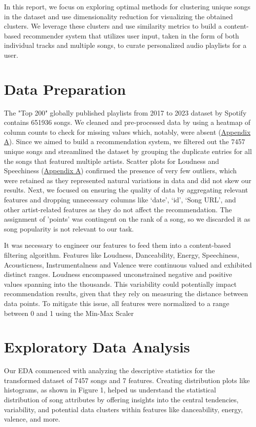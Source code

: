 \documentclass{article}
\begin{document}
In this report, we focus on exploring optimal methods for clustering unique songs in the dataset and use dimensionality reduction for visualizing the obtained clusters. We leverage these clusters and use similarity metrics to build a content-based recommender system that utilizes user input, taken in the form of both individual tracks and multiple songs, to curate personalized audio playlists for a user.

\section{Data Preparation}
The "Top 200" globally published playlists from 2017 to 2023 dataset by Spotify contains 651936 songs. We cleaned and pre-processed data by using a heatmap of column counts to check for missing values which, notably, were absent (\hyperref[app:heat-map]{Appendix A}). Since we aimed to build a recommendation system, we filtered out the 7457 unique songs and streamlined the dataset by grouping the duplicate entries for all the songs that featured multiple artists. Scatter plots for Loudness and Speechiness (\hyperref[app:outliers-scatterplot]{Appendix A}) confirmed the presence of very few outliers, which were retained as they represented natural variations in data and did not skew our results. Next, we focused on ensuring the quality of data by aggregating relevant features and dropping unnecessary columns like ‘date’, ‘id’, ‘Song URL', and other artist-related features as they do not affect the recommendation. The assignment of 'points' was contingent on the rank of a song, so we discarded it as song popularity is not relevant to our task.

It was necessary to engineer our features to feed them into a content-based filtering algorithm. Features like Loudness, Danceability, Energy, Speechiness, Acousticness, Instrumentalness and Valence were continuous valued and exhibited distinct ranges. Loudness encompassed unconstrained negative and positive values spanning into the thousands. This variability could potentially impact recommendation results, given that they rely on measuring the distance between data points. To mitigate this issue, all features were normalized to a range between 0 and 1 using the Min-Max Scaler 


\section{Exploratory Data Analysis}
Our EDA commenced with analyzing the descriptive statistics for the transformed dataset of 7457 songs and 7 features. Creating distribution plots like histograms, as shown in Figure 1, helped us understand the statistical distribution of song attributes by offering insights into the central tendencies, variability, and potential data clusters within features like danceability, energy, valence, and more.
\end{document}
